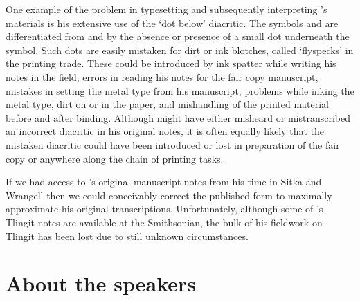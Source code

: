 One example of the problem in typesetting and subsequently interpreting \citeauthor{swanton:1909}’s materials is his extensive use of the ‘dot below’ diacritic.
The symbols  and  are differentiated from  and  by the absence or presence of a small dot underneath the symbol.
Such dots are easily mistaken for dirt or ink blotches, called ‘flyspecks’ in the printing trade.
These could be introduced by ink spatter while writing his notes in the field, errors in reading his notes for the fair copy manuscript, mistakes in setting the metal type from his manuscript, problems while inking the metal type, dirt on or in the paper, and mishandling of the printed material before and after binding.
Although \citeauthor{swanton:1909} might have either misheard or mistranscribed an incorrect diacritic in his original notes, it is often equally likely that the mistaken diacritic could have been introduced or lost in preparation of the fair copy or anywhere along the chain of printing tasks.

If we had access to \citeauthor{swanton:1909}’s original manuscript notes from his time in Sitka and Wrangell then we could conceivably correct the published form to maximally approximate his original transcriptions.
Unfortunately, although some of \citeauthor{swanton:1909}’s Tlingit notes are available at the Smithsonian, the bulk of his fieldwork on Tlingit has been lost due to still unknown circumstances.
 



\section{About the speakers}\label{sec:intro-speakers}


